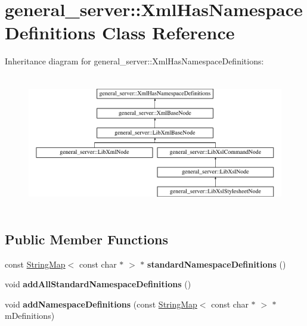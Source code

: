 \hypertarget{classgeneral__server_1_1XmlHasNamespaceDefinitions}{\section{general\-\_\-server\-:\-:\-Xml\-Has\-Namespace\-Definitions \-Class \-Reference}
\label{classgeneral__server_1_1XmlHasNamespaceDefinitions}
}
\-Inheritance diagram for general\-\_\-server\-:\-:\-Xml\-Has\-Namespace\-Definitions\-:\begin{figure}[H]
\begin{center}
\leavevmode
\includegraphics[height=5.978648cm]{classgeneral__server_1_1XmlHasNamespaceDefinitions}
\end{center}
\end{figure}
\subsection*{\-Public \-Member \-Functions}
\begin{DoxyCompactItemize}
\item 
\hypertarget{classgeneral__server_1_1XmlHasNamespaceDefinitions_accf8745e0e70eec724c637119320365a}{const \hyperlink{classgeneral__server_1_1StringMap}{\-String\-Map}$<$ const char $\ast$ $>$ $\ast$ {\bfseries standard\-Namespace\-Definitions} ()}\label{classgeneral__server_1_1XmlHasNamespaceDefinitions_accf8745e0e70eec724c637119320365a}

\item 
\hypertarget{classgeneral__server_1_1XmlHasNamespaceDefinitions_afe2585e2349164c906eb21314edd0615}{void {\bfseries add\-All\-Standard\-Namespace\-Definitions} ()}\label{classgeneral__server_1_1XmlHasNamespaceDefinitions_afe2585e2349164c906eb21314edd0615}

\item 
\hypertarget{classgeneral__server_1_1XmlHasNamespaceDefinitions_a1e37c5ee598054da25575a1d0fbe7c99}{void {\bfseries add\-Namespace\-Definitions} (const \hyperlink{classgeneral__server_1_1StringMap}{\-String\-Map}$<$ const char $\ast$ $>$ $\ast$m\-Definitions)}\label{classgeneral__server_1_1XmlHasNamespaceDefinitions_a1e37c5ee598054da25575a1d0fbe7c99}

\end{DoxyCompactItemize}
